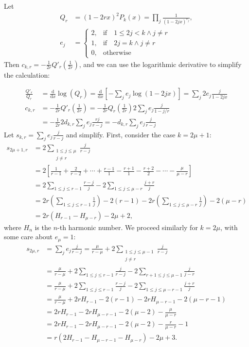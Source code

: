 \documentclass[a4paper]{amsart}
\numberwithin{equation}{section}
\begin{document}
Let
\[
\begin{aligned}
Q_r &= (1-2rx)^2 P_k(x) = \prod_{j} \frac{1}{(1-2jx)^{e_j}},\\
e_j &=
    \begin{cases}
    2,& \mathrm{if}\quad 1 \leq 2j < k \land  j \neq r \\
    1, & \mathrm{if} \quad 2j = k \land j \neq r \\
    0, & \mathrm{otherwise}
    \end{cases}
\end{aligned}
\]
Then $c_{k,r} = -\frac{1}{2r}Q'_r\left (\frac{1}{2r} \right)$, and we can use the logarithmic derivative to simplify the calculation:

\[
\begin{aligned}
    \frac{Q'_{r}}{Q_r} &= \frac{\mathrm{d}}{\mathrm{d}x}\log(Q_r) = \frac{\mathrm{d}}{\mathrm{d}x}\left[ -\sum_{j} e_j\log(1-2jx) \right]=  \sum_{j} 2e_j\frac{j}{1-2jx}  \\
    c_{k,r} &= - \frac{1}{2r}Q'_r\left (\frac{1}{2r} \right) = -\frac{1}{2r} Q_r\left(\frac{1}{2r}\right) 2\sum_{j} e_j\frac{j}{1-j/r} \\
    &= -\frac{1}{2r} 2 d_{k,r}\sum_{j}e_j\frac{rj }{r-j} = - d_{k,r}\sum_{j}e_j \frac{j}{r-j} 
\end{aligned}
\]
Let $s_{k,r}=\sum_{j}e_j\frac{j}{r-j}$ and simplify. First, consider the case $k=2\mu+1$:
\[
\begin{aligned}
    s_{2\mu+1,r} &=  2\sum_{\substack{1 \leq j \leq \mu \\ j \neq r}}\frac{j}{r-j} \\
    &= 2\left[\frac{1}{r-1}+\frac{2}{r-2} + \cdots  + \frac{r-1}{1}-\frac{r+1}{1}-\frac{r+2}{2}-\cdots-\frac{\mu}{\mu-r}\right]\\
    &= 2\sum_{1 \leq j \leq r-1}\frac{r-j}{j} -2\sum_{1 \leq j \leq \mu-r}\frac{j+r}{j} \\
    &= 2r\left(\sum_{1 \leq j \leq r-1}\frac{1}{j}\right) - 2(r-1) - 2r\left(\sum_{1 \leq j \leq \mu-r}\frac{1}{j}\right)-2(\mu-r)\\
    &= 2r(H_{r-1}-H_{\mu-r})-2\mu+2,
\end{aligned}
\]
where $H_n$ is the $n$-th harmonic number. We proceed similarly for $k=2\mu$, with some care about $e_{\mu}=1$:
\[
\begin{aligned}
    s_{2\mu,r} &= \sum_{j}e_j \frac{j}{r-j} = \frac{\mu}{r-\mu} + 2\sum_{\substack{1 \leq j \leq \mu-1 \\ j \neq r}}\frac{j}{r-j}\\
    &= \frac{\mu}{r-\mu} + 2 \sum_{1 \leq j \leq r-1} \frac{j}{r-j} - 2\sum_{r+1 \leq j \leq \mu-1}\frac{j}{j-r} \\
    &= \frac{\mu}{r-\mu} + 2\sum_{1 \leq j \leq r-1}\frac{r-j}{j} -2\sum_{1 \leq j \leq \mu-r-1}\frac{j+r}{j} \\
    &= \frac{\mu}{r-\mu} + 2rH_{r-1}-2(r-1)-2rH_{\mu-r-1}-2(\mu-r-1) \\
    &=  2rH_{r-1} - 2rH_{\mu-r-1}-2(\mu-2)-\frac{\mu}{\mu-r}  \\
    &= 2rH_{r-1} - 2rH_{\mu-r-1} - 2(\mu-2) - \frac{r}{\mu-r} -1 \\
    &= r\left(2H_{r-1} - H_{\mu-r-1}-H_{\mu-r}\right) - 2\mu + 3.
\end{aligned}
\]
\end{document}
